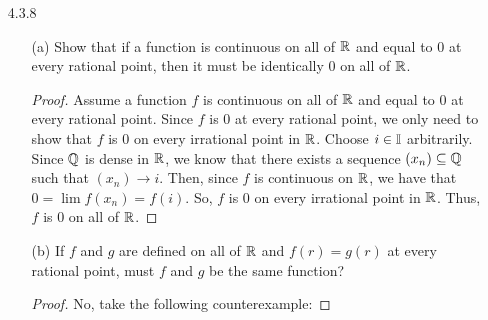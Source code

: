 \documentclass[12pt,letterpaper]{article}
\begin{document}
\begin{itemize}[leftmargin=!,labelindent=5pt]
\begin{itemize}
                    \begin{proof}
                        Choose $i \in \bbI$ arbitrarily.
                        Need to show that for all $V_\epsilon(t(i))$, there exists a $V_\delta(i)$ such that $v \in V_\delta(i)$ implies $t(v) \in V_\epsilon(t(i))$.
                        Choose $\epsilon > 0$ arbitrarily.
                        Let $T = \{x \in \bbR : t(x) \geq \epsilon\}$.
                        Then, for all $x\in T$, $x \in \bbQ$ so $\exists m,n \in \bbZ$ such that $x = \frac{m}{n}$ and $0 < n \leq \frac{1}{\epsilon}$.
                        Then, if we look at some fixed interval around $i$ like $[i-1, i+1]$, we can see that $T \cap [i-1, i+1]$ is finite since there are only a finite amount of rational numbers within this interval with a denominator less than $\frac{1}{\epsilon}$.
                        Since $T \cap [i-1, i+1]$ is finite, we can choose $\delta > 0$ such that for all $v \in V_\delta(i)$, $v \notin T$ which means that $t(v) \in V_\epsilon(t(i))$.
                        Thus, $t$ is continuous at every irrational point by Theorem 4.3.2 (iii).
                    \end{proof}
            \end{itemize}
        \newpage
        \item [4.3.8]
            \begin{itemize}
                \item [(a)] Show that if a function is continuous on all of $\mathbb{R}$ and equal to 0 at every rational point, then it must be identically 0 on all of $\mathbb{R}$.
                    \begin{proof}
                        Assume a function $f$ is continuous on all of $\mathbb{R}$ and equal to 0 at every rational point.
                        Since $f$ is 0 at every rational point, we only need to show that $f$ is 0 on every irrational point in $\mathbb{R}$.
                        Choose $i\in\bbI$ arbitrarily.
                        Since $\mathbb{Q}$ is dense in $\mathbb{R}$, we know that there exists a sequence $(x_n) \subseteq \mathbb{Q}$ such that $(x_n)\to i$.
                        Then, since $f$ is continuous on $\mathbb{R}$, we have that $0 = \lim f(x_n) = f(i)$.
                        So, $f$ is 0 on every irrational point in $\mathbb{R}$.
                        Thus, $f$ is 0 on all of $\mathbb{R}$.
                    \end{proof}
                \item [(b)] If $f$ and $g$ are defined on all of $\mathbb{R}$ and $f(r) = g(r)$ at every rational point, must $f$ and $g$ be the same function?
                    \begin{proof}
                        No, take the following counterexample:


\end{proof}
\end{itemize}
\end{itemize}
\end{document}
